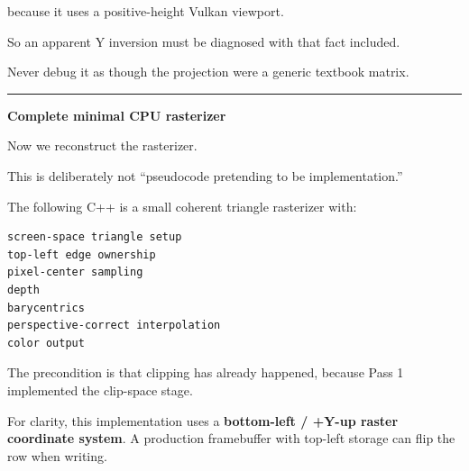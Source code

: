 because it uses a positive-height Vulkan viewport.

So an apparent Y inversion must be diagnosed with that fact included.

Never debug it as though the projection were a generic textbook matrix.

\begin{center}\rule{0.5\linewidth}{0.5pt}\end{center}

\textbf{Complete minimal CPU rasterizer}

Now we reconstruct the rasterizer.

This is deliberately not ``pseudocode pretending to be implementation.''

The following C++ is a small coherent triangle rasterizer with:

\begin{verbatim}
screen-space triangle setup
top-left edge ownership
pixel-center sampling
depth
barycentrics
perspective-correct interpolation
color output
\end{verbatim}

The precondition is that clipping has already happened, because Pass 1 implemented the clip-space stage.

For clarity, this implementation uses a \textbf{bottom-left / +Y-up raster coordinate system}. A production framebuffer with top-left storage can flip the row when writing.

